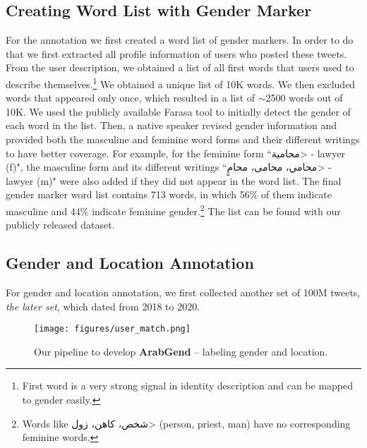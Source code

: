 \documentclass[sigconf,authorversion,nonacm]{acmart}
\begin{document}
\subsection{Creating Word List with Gender Marker}
\label{ssec:creating_word_list}
For the annotation we first created a word list of gender markers. In order to do that we first extracted all profile information of users who posted these tweets. From the user description, we obtained a list of all first words that users used to describe themselves.\footnote{First word is a very strong signal in identity description and can be mapped to gender easily.} We obtained a unique list of 10K words. We then excluded words that appeared only once, which resulted in a  list of $\sim$2500 words out of 10K. We used the publicly available Farasa tool \cite{darwish2016farasa} to initially detect the gender of each word in the list. Then, a native speaker revised gender information and provided both the masculine and feminine word forms and their different writings to have better coverage. For example, for the feminine form ``\<محامية> - lawyer (f)", the masculine form and its different writings ``\<محامي، محامى، محامٍ> - lawyer (m)" were also added if they did not appear in the word list.
The final gender marker word list contains 713 words, in which 56\% of them indicate masculine and 44\% indicate feminine gender.\footnote{Words like \<شخص، كاهن، زول> (person, priest, man) have no corresponding feminine words.} The list can be found with our publicly released dataset.

\subsection{Gender and Location Annotation}
\label{ssec:gender_location_data_annotation}
For gender and location annotation, we first collected another set of 100M tweets, \textit{the later set}, which dated from 2018 to 2020.

\begin{figure}[t]
	\begin{center}
		\texttt{[image: figures/user\_match.png]} 
		\caption{Our pipeline to develop \textbf{ArabGend} -- labeling gender and location.
		}
		\label{fig:user_matching_wordlist}
	\end{center}
\end{figure}
\end{document}
